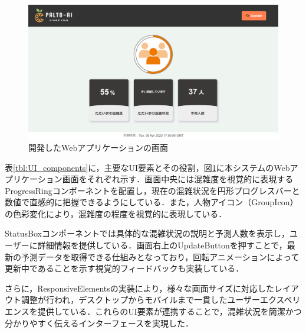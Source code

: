 \begin{figure}[tb]
	\centering
	\includegraphics[width=1.0\linewidth]{images/webapp_screenshot.png}
	\caption{開発したWebアプリケーションの画面}
	\label{fig:webapp_screenshot}
\end{figure}

表\ref{tbl:UI_components}に，主要なUI要素とその役割，図\ref{fig:webapp_screenshot}に本システムのWebアプリケーション画面をそれぞれ示す．画面中央には混雑度を視覚的に表現するProgressRingコンポーネントを配置し，現在の混雑状況を円形プログレスバーと数値で直感的に把握できるようにしている．また，人物アイコン（GroupIcon）の色彩変化により，混雑度の程度を視覚的に表現している．

StatusBoxコンポーネントでは具体的な混雑状況の説明と予測人数を表示し，ユーザーに詳細情報を提供している．画面右上のUpdateButtonを押すことで，最新の予測データを取得できる仕組みとなっており，回転アニメーションによって更新中であることを示す視覚的フィードバックも実装している．

さらに，ResponsiveElementsの実装により，様々な画面サイズに対応したレイアウト調整が行われ，デスクトップからモバイルまで一貫したユーザーエクスペリエンスを提供している．これらのUI要素が連携することで，混雑状況を簡潔かつ分かりやすく伝えるインターフェースを実現した．